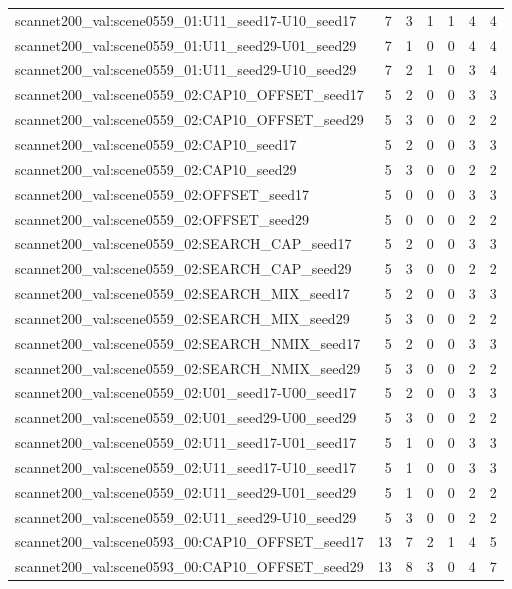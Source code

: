 \begin{table}[t]
\begin{tabular}{lrrrrrr}
scannet200\_val:scene0559\_01:U11\_seed17-U10\_seed17 & 7 & 3 & 1 & 1 & 4 & 4 \\
scannet200\_val:scene0559\_01:U11\_seed29-U01\_seed29 & 7 & 1 & 0 & 0 & 4 & 4 \\
scannet200\_val:scene0559\_01:U11\_seed29-U10\_seed29 & 7 & 2 & 1 & 0 & 3 & 4 \\
scannet200\_val:scene0559\_02:CAP10\_OFFSET\_seed17 & 5 & 2 & 0 & 0 & 3 & 3 \\
scannet200\_val:scene0559\_02:CAP10\_OFFSET\_seed29 & 5 & 3 & 0 & 0 & 2 & 2 \\
scannet200\_val:scene0559\_02:CAP10\_seed17 & 5 & 2 & 0 & 0 & 3 & 3 \\
scannet200\_val:scene0559\_02:CAP10\_seed29 & 5 & 3 & 0 & 0 & 2 & 2 \\
scannet200\_val:scene0559\_02:OFFSET\_seed17 & 5 & 0 & 0 & 0 & 3 & 3 \\
scannet200\_val:scene0559\_02:OFFSET\_seed29 & 5 & 0 & 0 & 0 & 2 & 2 \\
scannet200\_val:scene0559\_02:SEARCH\_CAP\_seed17 & 5 & 2 & 0 & 0 & 3 & 3 \\
scannet200\_val:scene0559\_02:SEARCH\_CAP\_seed29 & 5 & 3 & 0 & 0 & 2 & 2 \\
scannet200\_val:scene0559\_02:SEARCH\_MIX\_seed17 & 5 & 2 & 0 & 0 & 3 & 3 \\
scannet200\_val:scene0559\_02:SEARCH\_MIX\_seed29 & 5 & 3 & 0 & 0 & 2 & 2 \\
scannet200\_val:scene0559\_02:SEARCH\_NMIX\_seed17 & 5 & 2 & 0 & 0 & 3 & 3 \\
scannet200\_val:scene0559\_02:SEARCH\_NMIX\_seed29 & 5 & 3 & 0 & 0 & 2 & 2 \\
scannet200\_val:scene0559\_02:U01\_seed17-U00\_seed17 & 5 & 2 & 0 & 0 & 3 & 3 \\
scannet200\_val:scene0559\_02:U01\_seed29-U00\_seed29 & 5 & 3 & 0 & 0 & 2 & 2 \\
scannet200\_val:scene0559\_02:U11\_seed17-U01\_seed17 & 5 & 1 & 0 & 0 & 3 & 3 \\
scannet200\_val:scene0559\_02:U11\_seed17-U10\_seed17 & 5 & 1 & 0 & 0 & 3 & 3 \\
scannet200\_val:scene0559\_02:U11\_seed29-U01\_seed29 & 5 & 1 & 0 & 0 & 2 & 2 \\
scannet200\_val:scene0559\_02:U11\_seed29-U10\_seed29 & 5 & 3 & 0 & 0 & 2 & 2 \\
scannet200\_val:scene0593\_00:CAP10\_OFFSET\_seed17 & 13 & 7 & 2 & 1 & 4 & 5 \\
scannet200\_val:scene0593\_00:CAP10\_OFFSET\_seed29 & 13 & 8 & 3 & 0 & 4 & 7 \\

\end{tabular}
\end{table}
